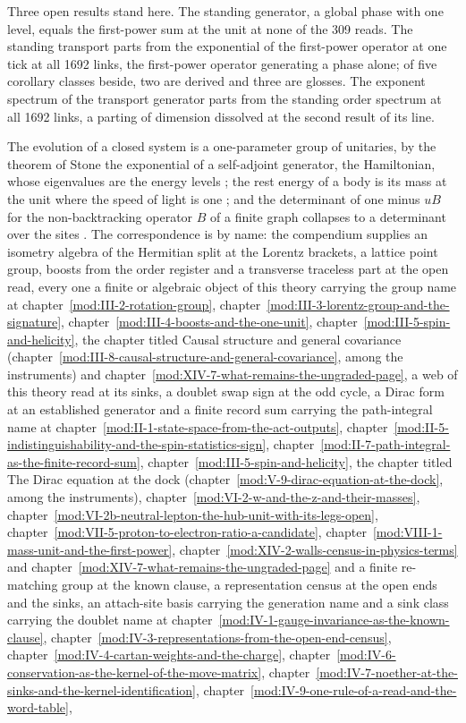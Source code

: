Three open results stand here. The standing generator, a global phase with one level, equals the first-power sum at the unit at none of the 309 reads. The standing transport parts from the exponential of the first-power operator at one tick at all 1692 links, the first-power operator generating a phase alone; of five corollary classes beside, two are derived and three are glosses. The exponent spectrum of the transport generator parts from the standing order spectrum at all 1692 links, a parting of dimension dissolved at the second result of its line.
\begin{chbridge}
The evolution of a closed system is a one-parameter group of unitaries, by the theorem of Stone the exponential of a self-adjoint generator, the Hamiltonian, whose eigenvalues are the energy levels \cite{Stone1932}; the rest energy of a body is its mass at the unit where the speed of light is one \cite{Dirac1958}; and the determinant of one minus $uB$ for the non-backtracking operator $B$ of a finite graph collapses to a determinant over the sites \cite{Bass1992}. The correspondence is by name: the compendium supplies an isometry algebra of the Hermitian split at the Lorentz brackets, a lattice point group, boosts from the order register and a transverse traceless part at the open read, every one a finite or algebraic object of this theory carrying the group name at chapter~\ref{mod:III-2-rotation-group}, chapter~\ref{mod:III-3-lorentz-group-and-the-signature}, chapter~\ref{mod:III-4-boosts-and-the-one-unit}, chapter~\ref{mod:III-5-spin-and-helicity}, the chapter titled Causal structure and general covariance (chapter~\ref{mod:III-8-causal-structure-and-general-covariance}, among the instruments) and chapter~\ref{mod:XIV-7-what-remains-the-ungraded-page}, a web of this theory read at its sinks, a doublet swap sign at the odd cycle, a Dirac form at an established generator and a finite record sum carrying the path-integral name at chapter~\ref{mod:II-1-state-space-from-the-act-outputs}, chapter~\ref{mod:II-5-indistinguishability-and-the-spin-statistics-sign}, chapter~\ref{mod:II-7-path-integral-as-the-finite-record-sum}, chapter~\ref{mod:III-5-spin-and-helicity}, the chapter titled The Dirac equation at the dock (chapter~\ref{mod:V-9-dirac-equation-at-the-dock}, among the instruments), chapter~\ref{mod:VI-2-w-and-the-z-and-their-masses}, chapter~\ref{mod:VI-2b-neutral-lepton-the-hub-unit-with-its-legs-open}, chapter~\ref{mod:VII-5-proton-to-electron-ratio-a-candidate}, chapter~\ref{mod:VIII-1-mass-unit-and-the-first-power}, chapter~\ref{mod:XIV-2-walls-census-in-physics-terms} and chapter~\ref{mod:XIV-7-what-remains-the-ungraded-page} and a finite re-matching group at the known clause, a representation census at the open ends and the sinks, an attach-site basis carrying the generation name and a sink class carrying the doublet name at chapter~\ref{mod:IV-1-gauge-invariance-as-the-known-clause}, chapter~\ref{mod:IV-3-representations-from-the-open-end-census}, chapter~\ref{mod:IV-4-cartan-weights-and-the-charge}, chapter~\ref{mod:IV-6-conservation-as-the-kernel-of-the-move-matrix}, chapter~\ref{mod:IV-7-noether-at-the-sinks-and-the-kernel-identification}, chapter~\ref{mod:IV-9-one-rule-of-a-read-and-the-word-table}, 
\end{chbridge}
